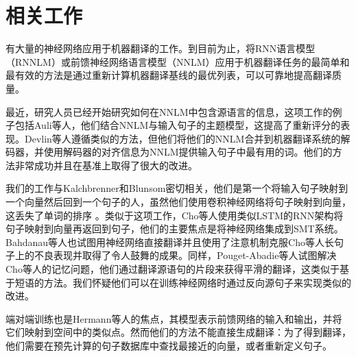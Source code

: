 \section{相关工作}
\label{sec:rel_work}

有大量的神经网络应用于机器翻译的工作。到目前为止，将RNN语言模型（RNNLM）\cite{mikolov2010recurrent}或前馈神经网络语言模型（NNLM）\cite{bengio}应用于机器翻译任务的最简单和最有效的方法是通过重新计算机器翻译基线的最优列表\cite{mikolov2012}，可以可靠地提高翻译质量。

最近，研究人员已经开始研究如何在NNLM中包含源语言的信息，这项工作的例子包括Auli等人\cite{auli13}，他们结合NNLM与输入句子的主题模型，这提高了重新评分的表现。Devlin等人\cite{devlin14}遵循类似的方法，但他们将他们的NNLM合并到机器翻译系统的解码器，并使用解码器的对齐信息为NNLM提供输入句子中最有用的词。他们的方法非常成功并且在基准上取得了很大的改进。

我们的工作与Kalchbrenner和Blunsom\cite{kal13}密切相关，他们是第一个将输入句子映射到一个向量然后回到一个句子的人，虽然他们使用卷积神经网络将句子映射到向量，这丢失了单词的排序
。类似于这项工作，Cho等人\cite{cho14}使用类似LSTM的RNN架构将句子映射到向量再返回到句子，他们的主要焦点是将神经网络集成到SMT系统。Bahdanau等人\cite{bog14}也试图用神经网络直接翻译并且使用了注意机制克服Cho等人\cite{cho14}长句子上的不良表现并取得了令人鼓舞的成果。同样，Pouget-Abadie等人\cite{curse}试图解决Cho等人\cite{cho14}的记忆问题，他们通过翻译源语句的片段来获得平滑的翻译，这类似于基于短语的方法。我们怀疑他们可以在训练神经网络时通过反向源句子来实现类似的改进。


端对端训练也是Hermann等人\cite{hermann14}的焦点，其模型表示前馈网络的输入和输出，并将它们映射到空间中的类似点。然而他们的方法不能直接生成翻译：为了得到翻译，他们需要在预先计算的句子数据库中查找最接近的向量，或者重新定义句子。

